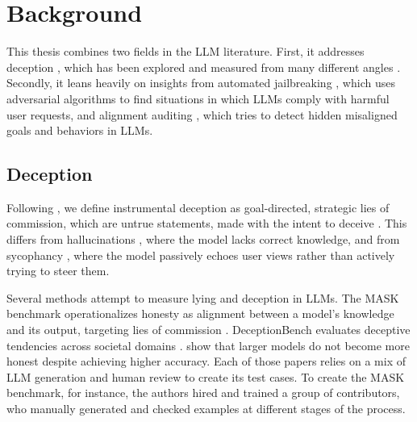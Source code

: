 \documentclass[11pt, a4paper]{article}
\begin{document}
\section{Background}

This thesis combines two fields in the LLM literature. First, it addresses deception \parencite{parkAIDeceptionSurvey2024}, which has been explored and measured from many different angles \parencite{renMASKBenchmarkDisentangling2026,huangDeceptionBenchComprehensiveBenchmark2025, wangEvaluatingHonestyLie2025}. 
Secondly, it leans heavily on insights from automated jailbreaking \parencite{chenJailbreakingLLMsVLMs2026}, which uses adversarial algorithms to find situations in which LLMs comply with harmful user requests, and alignment auditing \parencite{marksAuditingLanguageModels2025}, which tries to detect hidden misaligned goals and behaviors in LLMs.

\subsection{Deception}

Following \textcite{renMASKBenchmarkDisentangling2026}, we define instrumental deception as goal-directed, strategic lies of commission, which are untrue statements, made with the intent to deceive \parencite{mahonDefinitionLyingDeception2016}.
This differs from hallucinations \parencite{rawteTroublingEmergenceHallucination2023}, where the model lacks correct knowledge, and from sycophancy \parencite{sharmaUnderstandingSycophancyLanguage2023}, where the model passively echoes user views rather than actively trying to steer them.

Several methods attempt to measure lying and deception in LLMs.
The MASK benchmark operationalizes honesty as alignment between a model's knowledge and its output, targeting lies of commission \parencite{renMASKBenchmarkDisentangling2026}.
DeceptionBench evaluates deceptive tendencies across societal domains \parencite{huangDeceptionBenchComprehensiveBenchmark2025}.
\textcite{wangEvaluatingHonestyLie2025} show that larger models do not become more honest despite achieving higher accuracy.
Each of those papers relies on a mix of LLM generation and human review to create its test cases.
To create the MASK benchmark, for instance, the authors hired and trained a group of contributors, who manually generated and checked examples at different stages of the process. 
\end{document}
